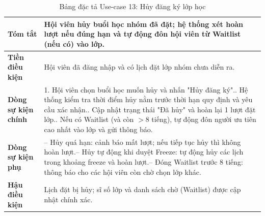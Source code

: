 \documentclass[a4paper,12pt]{article}
\begin{document}
\begin{table}[H]\centering\footnotesize
\begin{tabularx}{\textwidth}{|L{3.2cm}|Y|}
\hline \textbf{Tóm tắt} & Hội viên hủy buổi học nhóm đã đặt; hệ thống xét hoàn lượt nếu đúng hạn và tự động đôn hội viên từ Waitlist (nếu có) vào lớp. \\ \hline
\textbf{Tiền điều kiện} & Hội viên đã đăng nhập và có lịch đặt lớp nhóm chưa diễn ra. \\ \hline
\textbf{Dòng sự kiện chính} & 1. Hội viên chọn buổi học muốn hủy và nhấn "Hủy đăng ký".. Hệ thống kiểm tra thời điểm hủy nằm trước thời hạn quy định và yêu cầu xác nhận.. Cập nhật trạng thái "Đã hủy" và hoàn lại 1 lượt đặt lớp.. Nếu có Waitlist (và còn $> 8$ tiếng), tự động đôn người ưu tiên cao nhất vào lớp và gửi thông báo. \\ \hline
\textbf{Dòng sự kiện phụ} & -- Hủy quá hạn: cảnh báo mất lượt; nếu tiếp tục hủy thì không hoàn lượt.\newline -- Hủy tự động khi duyệt Freeze: tự động hủy các lịch trong khoảng freeze và hoàn lượt.\newline -- Đóng Waitlist trước 8 tiếng: thông báo cho các hội viên còn chờ chọn lớp khác. \\ \hline
\textbf{Hậu điều kiện} & Lịch đặt bị hủy; sĩ số lớp và danh sách chờ (Waitlist) được cập nhật chính xác. \\ \hline
\end{tabularx}
\caption{Bảng đặc tả Use-case 13: Hủy đăng ký lớp học}
\end{table}
\end{document}
